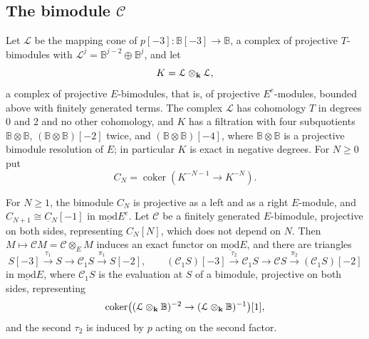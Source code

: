 \subsection{The bimodule \texorpdfstring{$\mathcal{C}$}{C}}
\label{subsec:two-cones}

Let $\mathcal{L}$ be the mapping cone of
${p[-3]\colon\mathbb{B}[-3]\to\mathbb{B}}$,
a complex of projective $T$-bimodules with ${\mathcal{L}^j=\mathbb{B}^{j-2}\oplus
\mathbb{B}^j}$, and let
\[
  K=\mathcal{L}\otimes_{\mathbf{k}}\mathcal{L},
\]
a complex of projective $E$-bimodules, that is, of projective $E^e$-modules,
bounded above with finitely generated terms. The complex $\mathcal{L}$ has
cohomology $T$ in degrees $0$ and $2$ and no other cohomology, and $K$ has a
filtration with four subquotients ${\mathbb{B}\otimes\mathbb{B}}$,
${(\mathbb{B}\otimes\mathbb{B})[-2]}$ twice, and ${(\mathbb{B}\otimes\mathbb{B})
[-4]}$, where ${\mathbb{B}\otimes\mathbb{B}}$ is a projective bimodule resolution
of $E$; in particular $K$ is exact in negative degrees. For ${N\geq0}$ put
\[
  C_N=\operatorname{coker}(K^{-N-1}\to K^{-N}).
\]

\begin{lemma}
  \label{lemma:two-cones}
  For ${N\geq1}$, the bimodule $C_N$ is projective as a left and as a right
  $E$-module, and ${C_{N+1}\cong C_N[-1]}$ in $\operatorname{\underline{mod}}E^e$.
  Let $\mathcal{C}$ be a finitely generated $E$-bimodule, projective on both
  sides, representing $C_N[N]$, which does not depend on $N$. Then
  ${M\mapsto\mathcal{C}M=\mathcal{C}\otimes_EM}$ induces an exact functor on
  $\operatorname{\underline{mod}}E$, and there are triangles
  \[
    S[-3]\xrightarrow{\tau_1}S\longrightarrow\mathcal{C}_1S
    \xrightarrow{\pi_1}S[-2],\qquad
    (\mathcal{C}_1S)[-3]\xrightarrow{\tau_2}\mathcal{C}_1S\longrightarrow
    \mathcal{C}S\xrightarrow{\pi_2}(\mathcal{C}_1S)[-2]
  \]
  in $\operatorname{\underline{mod}}E$, where $\mathcal{C}_1S$ is the
  evaluation at $S$ of a bimodule, projective on both sides, representing
  \[
    \operatorname{coker}\bigl((\mathcal{L}\otimes_{\mathbf{k}}\mathbb{B})^{-2}\to
    (\mathcal{L}\otimes_{\mathbf{k}}\mathbb{B})^{-1}\bigr)[1],
  \]
  and the second $\tau_2$ is induced by $p$ acting on the second factor.
\end{lemma}

